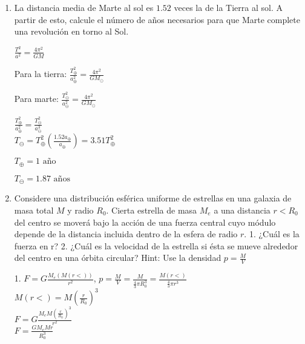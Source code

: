 \documentclass[10pt, a4paper]{article}
\begin{document}
\begin{enumerate}
        \item La distancia media de Marte al sol es $1.52$ veces la de la Tierra al sol.
        A partir de esto, calcule el número de años necesarios para que Marte
        complete una revolución en torno al Sol.

        \begin{center}
            $\frac{T^2}{a^2}=\frac{4\pi^2}{GM}$

            Para la tierra: $\frac{T_\oplus^2}{a_\oplus^2}= \frac{4\pi^2}{GM_\odot}$

            Para marte: $\frac{T_\ominus^2}{a_\ominus^2}= \frac{4\pi^2}{GM_\odot}$

            $\frac{T_\oplus^2}{a_\oplus^2}=\frac{T_\ominus^2}{a_\ominus^3}$\\
            $T_\ominus=T_\oplus^2(\frac{1.52a_\oplus}{a_\oplus})=3.51T_\oplus^2$

            $T_\oplus=1\si{\text{ año}}$

            $T_\ominus=1.87\si{\text{ años}}$

        \end{center}

        \item Considere una distribución esférica uniforme de estrellas en una galaxia
        de masa total $M$ y radio $R_0$. Cierta estrella de masa $M_e$ a una distancia
        $r < R_0$ del centro se moverá bajo la acción de una fuerza central cuyo
        módulo depende de la distancia incluida dentro de la esfera de radio $r$. 1.
        ¿Cuál es la fuerza en r? 2. ¿Cuál es la velocidad de la estrella si ésta se
        mueve alrededor del centro en una órbita circular? Hint: Use la densidad $p=\frac{M}{V}$

        \begin{center}

            1. $F=G\frac{M_e (M(r<))}{r^2}$, $p=\frac{M}{V}=\frac{M}{\frac{4}{3}\pi R_0^3}=\frac{M(r<)}{\frac{4}{3}\pi r^3}$\\ 
            $M(r<)=M(\frac{r}{R_0})^3$\\
            $F=G\frac{M_e M(\frac{r}{R_0})^3}{r^2}$\\
            $F=\frac{G M_e M r}{R_0^3}$


\end{center}
\end{enumerate}
\end{document}
